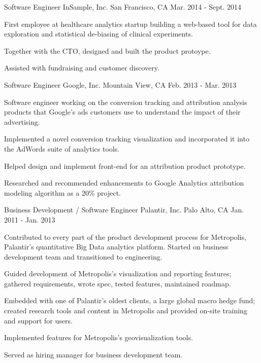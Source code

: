 \begin{cventries}
  \cventry
    {Software Engineer} %
    {InSample, Inc.} %
    {San Francisco, CA} %
    {Mar. 2014 - Sept. 2014} %
    {
      \begin{cvitems} %
        \item {First employee at healthcare analytics startup building a web-based tool for data exploration and statistical de-biasing of clinical experiments.}
        \item {Together with the CTO, designed and built the product protoype.}
        \item {Assisted with fundraising and customer discovery.}
      \end{cvitems}
    }

  \cventry
    {Software Engineer} %
    {Google, Inc.} %
    {Mountain View, CA} %
    {Feb. 2013 - Mar. 2013} %
    {
      \begin{cvitems} %
        \item {Software engineer working on the conversion tracking and attribution analysis products that Google’s ads customers use to understand the impact of their advertising.}
        \item {Implemented a novel conversion tracking visualization and incorporated it into the AdWords suite of analytics tools.}
        \item {Helped design and implement front-end for an attribution product prototype.}
        \item {Researched and recommended enhancements to Google Analytics attribution modeling algorithm as a 20\% project.}
      \end{cvitems}
    }

  \cventry
    {Business Development / Software Engineer} %
    {Palantir, Inc.} %
    {Palo Alto, CA} %
    {Jan. 2011 - Jan. 2013} %
    {
      \begin{cvitems} %
        \item {Contributed to every part of the product development process for Metropolis, Palantir’s quantitative Big Data analytics platform. Started on business development team and transitioned to engineering.}
        \item {Guided development of Metropolis’s visualization and reporting features; gathered requirements, wrote spec, tested features, maintained roadmap.}
        \item {Embedded with one of Palantir's oldest clients, a large global macro hedge fund; created research tools and content in Metropolis and provided on-site training and support for users.}
        \item {Implemented features for Metropolis's geovisualization tools.}
        \item {Served as hiring manager for business development team.}
      \end{cvitems}
    }

\end{cventries}
